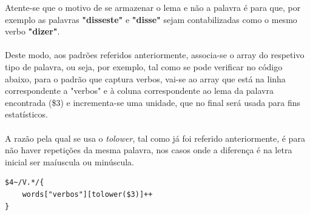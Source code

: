 \documentclass[11pt,a4paper]{report}%
\begin{document}
Atente-se que o motivo de se armazenar o lema e não a palavra é para que, por exemplo as palavras \textbf{"disseste"} e \textbf{"disse"} sejam contabilizadas como o mesmo verbo \textbf{"dizer"}.\\

\\Deste modo, aos padrões referidos anteriormente, associa-se o array do respetivo tipo de palavra, ou seja, por exemplo, tal como se pode verificar no código abaixo, para o padrão que captura verbos, vai-se ao array que está na linha correspondente a "verbos" e à coluna correspondente ao lema da palavra encontrada (\$3) e incrementa-se uma unidade, que no final será usada para fins estatísticos.
\\\\A razão pela qual se usa o \emph{tolower}, tal como já foi referido anteriormente, é para não haver repetições da mesma palavra, nos casos onde a diferença é na letra inicial ser maíuscula ou minúscula.

\begin{verbatim}
$4~/V.*/{
    words["verbos"][tolower($3)]++
}
\end{verbatim}
\end{document}
